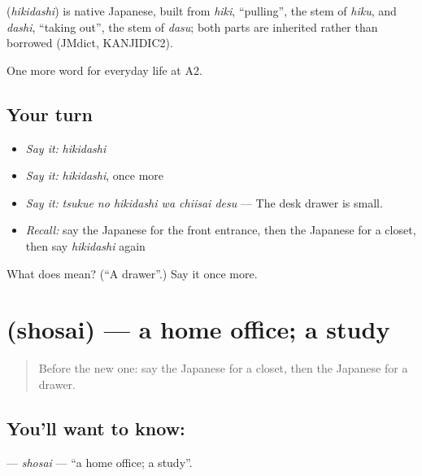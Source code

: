 \begin{cousinweb}
\textbf{} (\emph{hikidashi}) is native Japanese, built from \emph{hiki}, \textquotedblleft{}pulling\textquotedblright{}, the stem of \emph{hiku}, and \emph{dashi}, \textquotedblleft{}taking out\textquotedblright{}, the stem of \emph{dasu}; both parts are inherited rather than borrowed (JMdict, KANJIDIC2).
\end{cousinweb}

\begin{grammarlens}[title={What you've built}]
One more word for everyday life at A2.
\end{grammarlens}

\subsection*{Your turn}
\begin{itemize}
\raggedright
  \item \emph{Say it:} \emph{hikidashi}
  \item \emph{Say it:} \emph{hikidashi}, once more
  \item \emph{Say it:} \emph{tsukue no hikidashi wa chiisai desu} — The desk drawer is small.
  \item \emph{Recall:} say the Japanese for the front entrance, then the Japanese for a closet, then say \emph{hikidashi} again
\end{itemize}

\begin{tcolorbox}[breakable,colback=teal!4,colframe=teal!35!black,title={Before you move on}]
What does  mean? (\textquotedblleft{}A drawer\textquotedblright{}.) Say it once more.
\end{tcolorbox}
\section[\texorpdfstring{\ja{しょさい} (shosai)}{しょさい (shosai)}]{ (shosai) — a home office; a study}

\label{lesson:JA-C156-shosai}



\begin{quote}
Before the new one: say the Japanese for a closet, then the Japanese for a drawer.
\end{quote}

\subsection*{You'll want to know: }
\textbf{} — \emph{shosai} — \textquotedblleft{}a home office; a study\textquotedblright{}.

